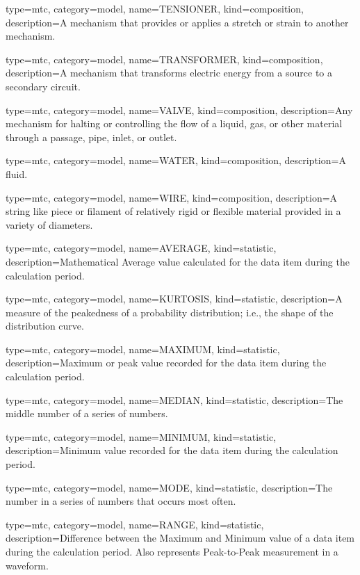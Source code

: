 {
  type=mtc,
  category=model,
  name={TENSIONER},
  kind={composition},
  description={A mechanism that provides or applies a stretch or strain to another mechanism.}
}


{
  type=mtc,
  category=model,
  name={TRANSFORMER},
  kind={composition},
  description={A mechanism that transforms electric energy from a source to a secondary circuit.}
}


{
  type=mtc,
  category=model,
  name={VALVE},
  kind={composition},
  description={Any mechanism for halting or controlling the flow of a liquid, gas, or other material through a passage, pipe, inlet, or outlet.}
}


{
  type=mtc,
  category=model,
  name={WATER},
  kind={composition},
  description={A fluid.}
}


{
  type=mtc,
  category=model,
  name={WIRE},
  kind={composition},
  description={A string like piece or filament of relatively rigid or flexible material provided in a variety of diameters.}
}


{
  type=mtc,
  category=model,
  name={AVERAGE},
  kind={statistic},
  description={Mathematical Average value calculated for the data item during the calculation period.}
}


{
  type=mtc,
  category=model,
  name={KURTOSIS},
  kind={statistic},
  description={A measure of the peakedness of a probability distribution; i.e., the shape of the distribution curve.}
}


{
  type=mtc,
  category=model,
  name={MAXIMUM},
  kind={statistic},
  description={Maximum or peak value recorded for the data item during the calculation period.}
}


{
  type=mtc,
  category=model,
  name={MEDIAN},
  kind={statistic},
  description={The middle number of a series of numbers.}
}


{
  type=mtc,
  category=model,
  name={MINIMUM},
  kind={statistic},
  description={Minimum value recorded for the data item during the calculation period.}
}


{
  type=mtc,
  category=model,
  name={MODE},
  kind={statistic},
  description={The number in a series of numbers that occurs most often.}
}


{
  type=mtc,
  category=model,
  name={RANGE},
  kind={statistic},
  description={Difference between the Maximum and Minimum value of a data item during the calculation period.  Also represents Peak-to-Peak measurement in a waveform.}
}



